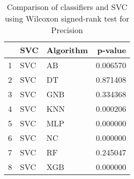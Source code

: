 \begin{table}
\footnotesize
\caption{Comparison of classifiers and SVC using Wilcoxon signed-rank test for Precision}
\label{tab:SVC wilcoxon Precision comparison}
\begin{tabular}{lllr}
\hline
 & SVC & Algorithm & p-value \\
\hline
1 & SVC & AB & 0.006570 \\
2 & SVC & DT & 0.871408 \\
3 & SVC & GNB & 0.334368 \\
4 & SVC & KNN & 0.000206 \\
5 & SVC & MLP & 0.000000 \\
6 & SVC & NC & 0.000000 \\
7 & SVC & RF & 0.245047 \\
8 & SVC & XGB & 0.000000 \\
\hline
\end{tabular}
\end{table}
